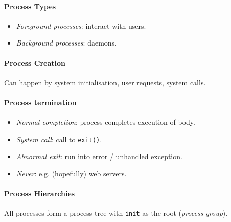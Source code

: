 \documentclass[twocolumn,english]{article}
\begin{document}
\paragraph{Process Types}
\begin{itemize}
\item \emph{Foreground processes}: interact with users.
\item \emph{Background processes}: daemons.
\end{itemize}

\paragraph{Process Creation}

Can happen by system initialisation, user requests, system calls.

\paragraph{Process termination}
\begin{itemize}
\item \emph{Normal completion}: process completes execution of body.
\item \emph{System call}: call to \texttt{exit()}.
\item \emph{Abnormal exit}: run into error / unhandled exception.
\item \emph{Never}: e.g. (hopefully) web servers.
\end{itemize}

\paragraph{Process Hierarchies}

All processes form a process tree with \texttt{init} as the root (\emph{process
group}).
\end{document}
